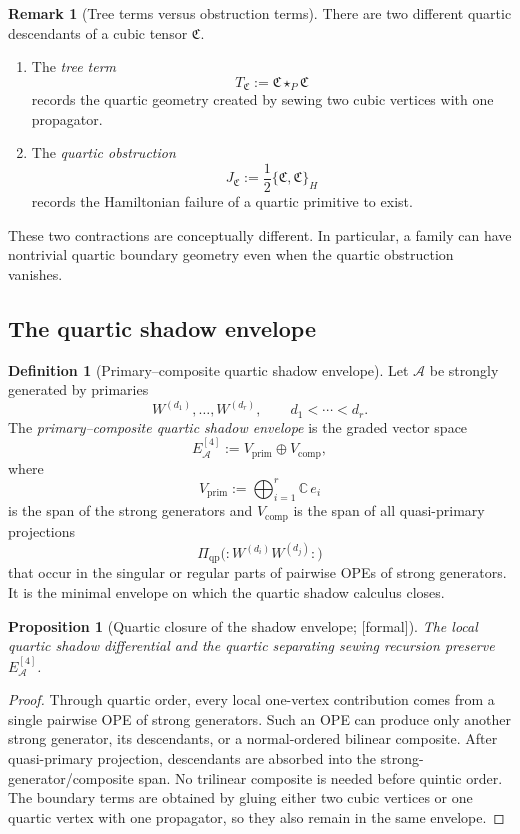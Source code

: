 \documentclass[11pt,oneside]{memoir}
\numberwithin{equation}{chapter}
\newtheorem{proposition}[theorem]{Proposition}
\theoremstyle{definition}
\newtheorem{definition}[theorem]{Definition}
\newtheorem{remark}[theorem]{Remark}
\newcommand{\ClaimStatusProvedHere}{\textnormal{[formal]}}
\newcommand{\cA}{\mathcal A}
\begin{document}
\begin{remark}[Tree terms versus obstruction terms]
\label{rem:nms-tree-vs-obstruction}
There are two different quartic descendants of a cubic tensor $\mathfrak C$.
\begin{enumerate}[label=\textup{(\roman*)}]
\item The \emph{tree term}
\[
T_{\mathfrak C}:=\mathfrak C\star_{P}\mathfrak C
\]
records the quartic geometry created by sewing two cubic vertices with one propagator.
\item The \emph{quartic obstruction}
\[
J_{\mathfrak C}:=\frac12\{\mathfrak C,\mathfrak C\}_{H}
\]
records the Hamiltonian failure of a quartic primitive to exist.
\end{enumerate}
These two contractions are conceptually different.  In particular, a family can have nontrivial quartic boundary geometry even when the quartic obstruction vanishes.
\end{remark}

\subsection{The quartic shadow envelope}
\label{subsec:nms-shadow-envelope}

\begin{definition}[Primary--composite quartic shadow envelope]
\label{def:nms-primary-composite-envelope}
Let $\cA$ be strongly generated by primaries
\[
W^{(d_1)},\dots,W^{(d_r)},\qquad d_1<\cdots<d_r.
\]
The \emph{primary--composite quartic shadow envelope} is the graded vector space
\[
E_{\cA}^{[4]}:=V_{\mathrm{prim}}\oplus V_{\mathrm{comp}},
\]
where
\[
V_{\mathrm{prim}}:=\bigoplus_{i=1}^r \mathbb C\,e_i
\]
is the span of the strong generators and $V_{\mathrm{comp}}$ is the span of all quasi-primary projections
\[
\Pi_{\mathrm{qp}}\bigl(:W^{(d_i)}W^{(d_j)}:\bigr)
\]
that occur in the singular or regular parts of pairwise OPEs of strong generators.  It is the minimal envelope on which the quartic shadow calculus closes.
\end{definition}

\begin{proposition}[Quartic closure of the shadow envelope; \ClaimStatusProvedHere]
\label{prop:nms-quartic-closure-envelope}
The local quartic shadow differential and the quartic separating sewing recursion preserve $E_{\cA}^{[4]}$.
\end{proposition}

\begin{proof}
Through quartic order, every local one-vertex contribution comes from a single pairwise OPE of strong generators.  Such an OPE can produce only another strong generator, its descendants, or a normal-ordered bilinear composite.  After quasi-primary projection, descendants are absorbed into the strong-generator/composite span.  No trilinear composite is needed before quintic order.  The boundary terms are obtained by gluing either two cubic vertices or one quartic vertex with one propagator, so they also remain in the same envelope.\qedhere
\end{proof}
\end{document}
